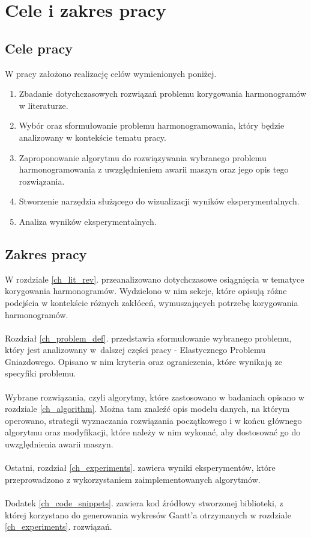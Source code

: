 \documentclass[printmode,oneside]{mgr}
\begin{document}
\chapter*{Cele i zakres pracy}
\section*{Cele pracy}
W pracy założono realizację celów wymienionych poniżej.
\begin{enumerate}
	\item Zbadanie dotychczasowych rozwiązań problemu korygowania harmonogramów w literaturze.
	\item Wybór oraz sformułowanie problemu harmonogramowania, który będzie analizowany w kontekście tematu pracy.
	\item Zaproponowanie algorytmu do rozwiązywania wybranego problemu harmonogramowania z uwzględnieniem awarii maszyn oraz jego opis tego rozwiązania.
	\item Stworzenie narzędzia służącego do wizualizacji wyników eksperymentalnych.
	\item Analiza wyników eksperymentalnych.
\end{enumerate}
\section*{Zakres pracy}
W rozdziale \ref{ch_lit_rev}. przeanalizowano dotychczasowe osiągnięcia w tematyce korygowania harmonogramów. Wydzielono w nim sekcje, które opisują różne podejścia w kontekście różnych zakłóceń, wymuszających potrzebę korygowania harmonogramów.\\\\
Rozdział \ref{ch_problem_def}. przedstawia sformułowanie wybranego problemu, który jest analizowany w~dalszej części pracy - Elastycznego Problemu Gniazdowego. Opisano w nim kryteria oraz ograniczenia, które wynikają ze specyfiki problemu.\\\\
Wybrane rozwiązania, czyli algorytmy, które zastosowano w badaniach opisano w rozdziale \ref{ch_algorithm}. Można tam znaleźć opis modelu danych, na którym operowano, strategii wyznaczania rozwiązania początkowego i w końcu głównego algorytmu oraz modyfikacji, które należy w nim wykonać, aby dostosować go do uwzględnienia awarii maszyn.\\\\
Ostatni, rozdział \ref{ch_experiments}. zawiera wyniki eksperymentów, które przeprowadzono z wykorzystaniem zaimplementowanych algorytmów.\\\\
Dodatek \ref{ch_code_snippets}. zawiera kod źródłowy stworzonej biblioteki, z której korzystano do generowania wykresów Gantt'a otrzymanych w rozdziale \ref{ch_experiments}. rozwiązań.
%
\end{document}
